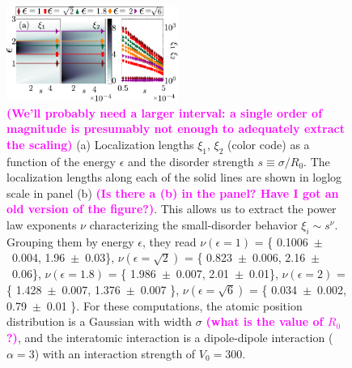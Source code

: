 \documentclass[prl,aps,twocolumn,showpacs,superscriptaddress,longbibliography]{revtex4-1}
\newcommand{\tochange}[1]{\textcolor{magenta}{#1}}
\newcommand{\mm}[1]{{\tochange{\footnotesize{\bf (#1)}}}}
\begin{document}
%
%
%
%
%
%
%
\begin{figure}

	      \includegraphics[width=0.5\textwidth]{graphics/loc_length_dipole_BW.pdf}

    \caption{\mm{We'll probably need a larger interval: a single order of magnitude is presumably not enough to adequately extract the scaling} (a) Localization lengths $\xi_1,\,\xi_2$ (color code)  as a function of the energy $\epsilon$ and the disorder strength $s \equiv \sigma / R_0$.
              The localization lengths along each of the solid lines are shown in loglog scale in panel (b) \mm{Is there a (b) in the panel? Have I got an old version of the figure?}. This allows us to extract the power law exponents $\nu$ characterizing the small-disorder behavior $\xi_i \sim s^\nu$.
              Grouping them by energy $\epsilon$, they read
                $\nu\left(\epsilon = 1\right)$ = \{ 0.1006~$\pm$~0.004, 1.96~$\pm$~0.03\}, 
 	        $\nu\left(\epsilon = \sqrt{2}\right)$ = \{ 0.823~$\pm$~0.006, 2.16~$\pm$~0.06\},
 		$\nu\left(\epsilon = 1.8\right)$ = \{ 1.986~$\pm$~0.007, 2.01~$\pm$~0.01\},   
  		$\nu\left(\epsilon = 2\right)$ = \{ 1.428~$\pm$~0.007, 1.376~$\pm$~0.007 \},
 		$\nu\left(\epsilon = \sqrt{6}\right)$ = \{ 0.034~$\pm$~0.002, 0.79~$\pm$~0.01 \}.
	 For these computations, the atomic position distribution is a Gaussian with width $\sigma$ \mm{what is the value of $R_0$?}, and the interatomic interaction is a dipole-dipole interaction ($\alpha = 3$) with an interaction strength of $V_0 = 300$.
	     } 
   \label{Fig:2D_loc_length}
\end{figure}  
\end{document}
